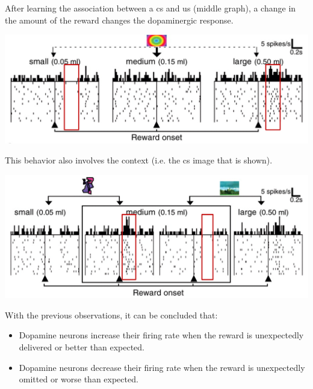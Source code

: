 \begin{description}
        \begin{@empty}
            \small
            \begin{example}
                After learning the association between a \ac{cs} and \ac{us} (middle graph), a change in the amount of the reward changes the dopaminergic response.
                \begin{center}
                    \includegraphics[width=0.6\linewidth]{./img/dopamine_expected2.png}
                \end{center}

                This behavior also involves the context (i.e. the \ac{cs} image that is shown).
                \begin{center}
                    \includegraphics[width=0.6\linewidth]{./img/dopamine_expected3.png}
                \end{center}
            \end{example}
        \end{@empty}
\end{description}

\begin{remark}
    With the previous observations, it can be concluded that:
    \begin{itemize}
        \item Dopamine neurons increase their firing rate when the reward is unexpectedly delivered or better than expected.
        \item Dopamine neurons decrease their firing rate when the reward is unexpectedly omitted or worse than expected.
    \end{itemize}
\end{remark}

